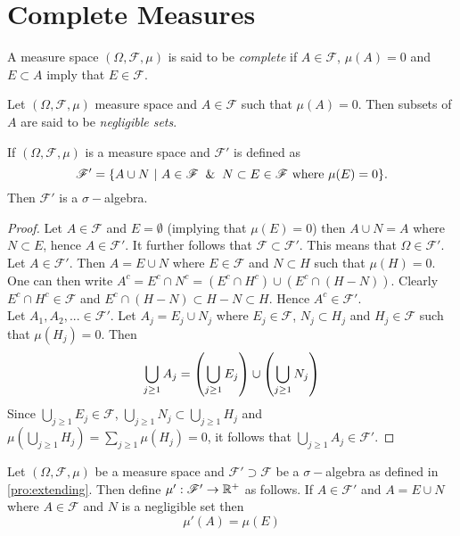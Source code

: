 \section{Complete Measures}
\begin{definition}
  A measure space $(\Omega, \mathscr{F}, \mu)$ is said to be \textit{complete} if $A\in \mathscr{F}$, $\mu(A) = 0$ and $E\subset A$ imply that $E\in \mathscr{F}$.
\end{definition}
\begin{definition} 
  Let $(\Omega, \mathscr{F}, \mu)$ measure space and $A\in \mathscr{F}$ such that $\mu(A) = 0$. Then subsets of $A$ are said to be \textit{negligible sets}.
\end{definition}
\begin{proposition}\label{pro:extending}
  If $(\Omega, \mathscr{F}, \mu)$ is a measure space and $\mathscr{F}'$ is defined as
  \[\mathscr{F}' = \{A\cup N\ |\ A\in \mathscr{F} \And N\subset E \in \mathscr{F}\ \text{where}\ \mu(E) = 0\}.\]
  Then $ \mathscr{F}'$ is a $\sigma-$algebra.
\end{proposition}
\begin{proof}
  Let $A\in \mathscr{F}$ and $E = \emptyset$ (implying that $\mu(E) = 0$) then $A\cup N = A$ where $N\subset E$, hence $A\in \mathscr{F}'$. It further follows that $ \mathscr{F} \subset \mathscr{F}'$. This means that $\Omega\in \mathscr{F}'$.\\

  Let $A \in \mathscr{F}'$. Then $A = E\cup N$ where $E \in \mathscr{F}$ and $N \subset H$ such that $\mu(H) = 0$. One can then write $A^c = E^c \cap N^c = (E^c \cap H^c) \cup (E^c \cap (H-N))$. Clearly $E^c\cap H^c \in \mathscr{F}$ and $E^c\cap (H-N) \subset H-N \subset H$. Hence $A^c \in \mathscr{F}'$.\\

  Let $A_1,A_2,... \in \mathscr{F}'$. Let $A_j = E_j \cup N_j$ where $E_j\in \mathscr{F}$, $N_j \subset H_j$ and $H_j \in \mathscr{F}$ such that $\mu(H_j) = 0$. Then
  \begin{align*}
    \bigcup_{j\geq 1} A_j= \left(\bigcup_{j\geq 1} E_j \right) \cup \left( \bigcup_{j\geq 1} N_j \right)
  \end{align*}
  Since $\bigcup_{j\geq1} E_j \in \mathscr{F}$, $ \bigcup_{j\geq1} N_j \subset \bigcup_{j\geq 1} H_j$ and $\mu(\bigcup_{j\geq1} H_j) = \sum_{j\geq1} \mu(H_j) = 0$, it follows that $\bigcup_{j\geq1} A_j \in \mathscr{F}'$. 
\end{proof}
\begin{definition}
  Let $(\Omega, \mathscr{F}, \mu)$ be a measure space and $ \mathscr{F}' \supset \mathscr{F}$ be a $\sigma-$algebra as defined in \cref{pro:extending}. Then define $\mu': \mathscr{F}' \to \mathbb{R}^+$ as follows. If $A\in \mathscr{F}'$ and $A = E \cup N$ where $A\in \mathscr{F}$ and $N$ is a negligible set then
  \[\mu'(A) = \mu(E)\]
\end{definition}

